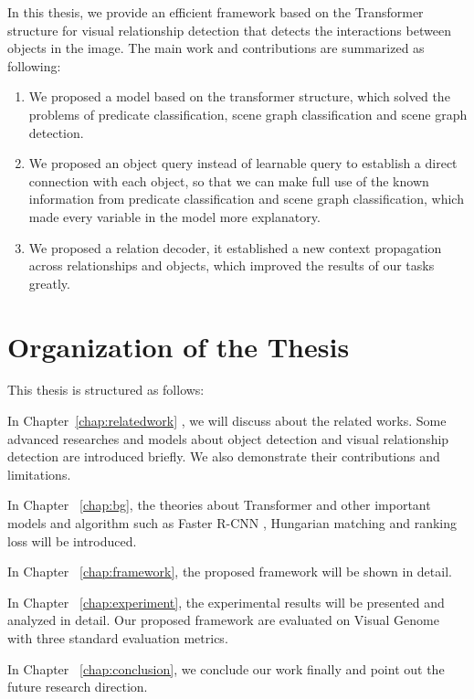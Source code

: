 In this thesis, we provide  an efficient framework based on the  Transformer structure  for visual relationship detection that detects the interactions between objects in the image. The main work and contributions are summarized as following:
\begin{enumerate}[\qquad  1.]
	\item We proposed a model based on the transformer structure, which solved the problems of predicate classification, scene graph classification and scene graph detection.
	\item We proposed an object query instead of learnable query to establish a direct connection with each object, so that we can make full use of the known information from predicate classification and scene graph classification, which made every variable in the model more explanatory.
	\item We proposed a relation decoder, it established a new context propagation across relationships and objects, which improved the results of our tasks greatly.
\end{enumerate}


\section{Organization of the Thesis}
This thesis is structured as follows:

In Chapter~\ref{chap:relatedwork} , we will discuss about the related works. Some advanced researches and models about object detection and visual relationship detection are introduced briefly. We also demonstrate their contributions and limitations.

In Chapter ~\ref{chap:bg}, the theories about Transformer and other important models and algorithm such as Faster R-CNN , Hungarian matching and ranking loss  will be introduced.

In Chapter ~\ref{chap:framework}, the proposed framework will be shown in detail.

In Chapter ~\ref{chap:experiment}, the experimental results will be presented and analyzed in detail. Our proposed framework are evaluated on Visual Genome with three standard evaluation metrics.

In Chapter ~\ref{chap:conclusion}, we conclude our work finally and point out the future research direction.